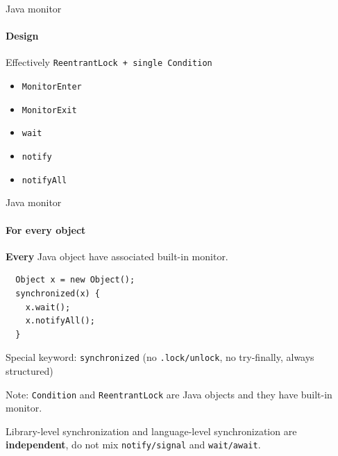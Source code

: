 \begin{frame}[fragile]{Java monitor}
\framesubtitle{Design}

Effectively \texttt{ReentrantLock + single Condition}

\begin{itemize}
    \item \texttt{MonitorEnter}
    \item \texttt{MonitorExit}
    \item \texttt{wait}
    \item \texttt{notify}
    \item \texttt{notifyAll}
\end{itemize}


\end{frame}

\begin{frame}[fragile]{Java monitor}
\framesubtitle{For every object}

\textbf{Every} Java object have associated built-in monitor.

\begin{verbatim}
  Object x = new Object();
  synchronized(x) {
    x.wait();
    x.notifyAll();
  }
\end{verbatim}

Special keyword: \texttt{synchronized} (no \texttt{.lock/unlock}, no try-finally, always structured)

Note: \texttt{Condition} and \texttt{ReentrantLock} are Java objects and they have built-in monitor.

Library-level synchronization and language-level synchronization are \textbf{independent}, do not mix \texttt{notify/signal} and \texttt{wait/await}.

\end{frame}


